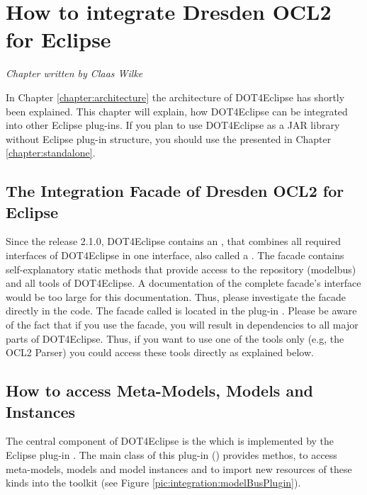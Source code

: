 \chapter{How to integrate Dresden OCL2 for Eclipse}
\label{chapter:integration}

\begin{flushright}
\textit{Chapter written by Claas Wilke}
\end{flushright}

In Chapter \ref{chapter:architecture} the architecture of \acl{DOT4Eclipse} has shortly been explained. This chapter will explain, how \acl{DOT4Eclipse} can be integrated into other Eclipse plug-ins. If you plan to use \acl{DOT4Eclipse} as a \acs{JAR} library without Eclipse plug-in structure, you should use the  presented in Chapter \ref{chapter:standalone}.



\section{The Integration Facade of Dresden OCL2 for Eclipse}

Since the release 2.1.0, \acl{DOT4Eclipse} contains an , that combines all required interfaces of \acl{DOT4Eclipse} in one interface, also called a  \cite{gamma:dp}. The facade contains self-explanatory static methods that provide access to the repository (modelbus) and all tools of \acl{DOT4Eclipse}. A documentation of the complete facade's interface would be too large for this documentation. Thus, please investigate the facade directly in the code. The facade called  is located in the plug-in . Please be aware of the fact that if you use the facade, you will result in dependencies to all major parts of \acl{DOT4Eclipse}. Thus, if you want to use one of the tools only (e.g, the \acs{OCL}2 Parser) you could access these tools directly as explained below.



\section{How to access Meta-Models, Models and Instances}

The central component of \acl{DOT4Eclipse} is the  which is implemented by the Eclipse plug-in . The main class of this plug-in () provides methos, to access meta-models, models and model instances and to import new resources of these kinds into the toolkit (see Figure \ref{pic:integration:modelBusPlugin}).

